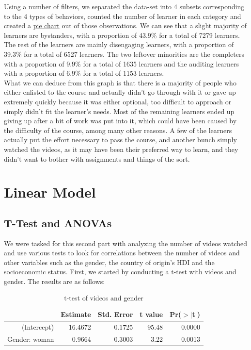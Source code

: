 \documentclass[12pt]{article}
\begin{document}
Using a number of filters, we separated the data-set into 4 subsets corresponding to the 4 types of behaviors, counted the number of learner in each category and created a \hyperref[pie]{pie chart} out of those observations. We can see that a slight majority of learners are bystanders, with a proportion of 43.9\% for a total of 7279 learners. The rest of the learners are mainly disengaging learners, with a proportion of 39.3\% for a total of 6527 learners. The two leftover minorities are the completers with a proportion of 9.9\% for a total of 1635 learners and the auditing learners with a proportion of 6.9\% for a total of 1153 learners. \\
What we can deduce from this graph is that there is a majority of people who either enlisted to the course and actually didn't go through with it or gave up extremely quickly because it was either optional, too difficult to approach or simply didn't fit the learner's needs. Most of the remaining learners ended up giving up after a bit of work was put into it, which could have been caused by the difficulty of the course, among many other reasons. A few of the learners actually put the effort necessary to pass the course, and another bunch simply watched the videos, as it may have been their preferred way to learn, and they didn't want to bother with assignments and things of the sort.

\section{Linear Model}
\subsection{T-Test and ANOVAs}

We were tasked for this second part with analyzing the number of videos watched and use various tests to look for correlations between the number of videos and other variables such as the gender, the country of origin's HDI and the  socioeconomic status. First, we started by conducting a t-test with videos and gender. The results are as follows:

\begin{table}[ht]
\centering
\begin{tabular}{rrrrr}
  \hline
 & Estimate & Std. Error & t value & Pr($>$$|$t$|$) \\ 
  \hline
(Intercept) & 16.4672 & 0.1725 & 95.48 & 0.0000 \\ 
  Gender: woman & 0.9664 & 0.3003 & 3.22 & 0.0013 \\ 
   \hline
\end{tabular}
\caption{t-test of videos and gender}
\end{table}
\end{document}
